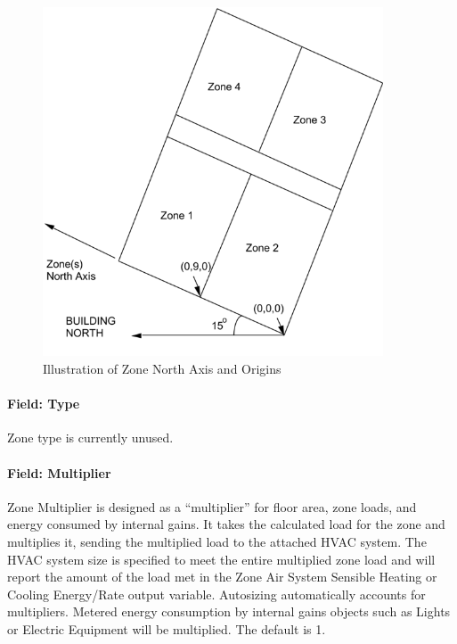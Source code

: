 \begin{figure}[hbtp] %
\centering
\includegraphics[width=0.9\textwidth, height=0.9\textheight, keepaspectratio=true]{media/image053.png}
\caption{Illustration of Zone North Axis and Origins \protect \label{fig:illustration-of-zone-north-axis-and-origins}}
\end{figure}

\paragraph{Field: Type}\label{field-type-000}

Zone type is currently unused.

\paragraph{Field: Multiplier}\label{field-multiplier}

Zone Multiplier is designed as a ``multiplier'' for floor area, zone loads, and energy consumed by internal gains. It takes the calculated load for the zone and multiplies it, sending the multiplied load to the attached HVAC system. The HVAC system size is specified to meet the entire multiplied zone load and will report the amount of the load met in the Zone Air System Sensible Heating or Cooling Energy/Rate output variable. Autosizing automatically accounts for multipliers. Metered energy consumption by internal gains objects such as Lights or Electric Equipment will be multiplied. The default is 1.

